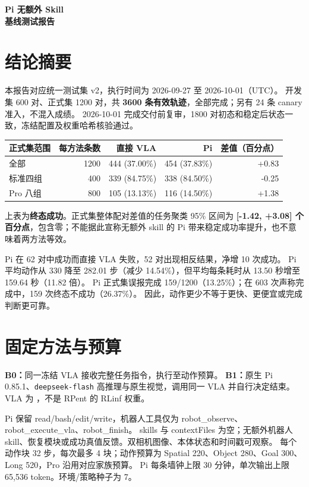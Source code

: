 \documentclass[UTF8,11pt,a4paper]{ctexart}
\begin{document}
\begin{titlepage}\centering\vspace*{0.32\textheight}
{\Huge\bfseries Pi 无额外 Skill\\[12pt]基线测试报告}
\end{titlepage}
\section{结论摘要}
本报告对应统一测试集 v2，执行时间为 2026-09-27 至 2026-10-01（UTC）。
开发集 600 对、正式集 1200 对，共 \textbf{3600 条有效轨迹}，全部完成；另有 24 条 canary 准入，不混入成绩。
2026-10-01 完成交付前复审，1800 对初态和稳定后状态一致，冻结配置及权重哈希核验通过。

\begin{center}
\begin{tabular}{lrrrr}
\toprule
正式集范围 & 每方法条数 & 直接 VLA & Pi & 差值（百分点）\\
\midrule
全部 & 1200 & 444 (37.00\%) & 454 (37.83\%) & +0.83\\
标准四组 & 400 & 339 (84.75\%) & 338 (84.50\%) & -0.25\\
Pro 八组 & 800 & 105 (13.13\%) & 116 (14.50\%) & +1.38\\
\bottomrule
\end{tabular}
\end{center}
上表为\textbf{终态成功}。正式集整体配对差值的任务聚类 95\% 区间为
\textbf{[-1.42, +3.08] 个百分点}，包含零；不能据此宣称无额外 skill 的 Pi 带来稳定成功率提升，也不意味着两方法等效。

Pi 在 62 对中成功而直接 VLA 失败，52 对出现相反结果，净增 10 次成功。
Pi 平均动作从 330 降至 282.01 步（减少 14.54\%），但平均每条耗时从 13.50 秒增至 159.64 秒（11.82 倍）。
Pi 正式集误报完成 159/1200（13.25\%）；在 603 次声称完成中，159 次终态不成功（26.37\%）。
因此，动作更少不等于更快、更便宜或完成判断更可靠。

\section{固定方法与预算}
\textbf{B0：}同一冻结 VLA 接收完整任务指令，执行至动作预算。
\textbf{B1：}原生 Pi 0.85.1、\texttt{deepseek-flash} 高推理与原生视觉，调用同一 VLA 并自行决定结束。
VLA 为 ，不是 RPent 的 RLinf 权重。

Pi 保留 read/bash/edit/write，机器人工具仅为 robot\_observe、robot\_execute\_vla、robot\_finish。
skills 与 contextFiles 为空；无额外机器人 skill、恢复模块或成功真值反馈。双相机图像、本体状态和时间戳可观察。
每个动作块 32 步，每次最多 4 块；动作预算为 Spatial 220、Object 280、Goal 300、Long 520，Pro 沿用对应家族预算。
Pi 每条墙钟上限 30 分钟，单次输出上限 65,536 token。环境/策略种子为 7。
\end{document}
